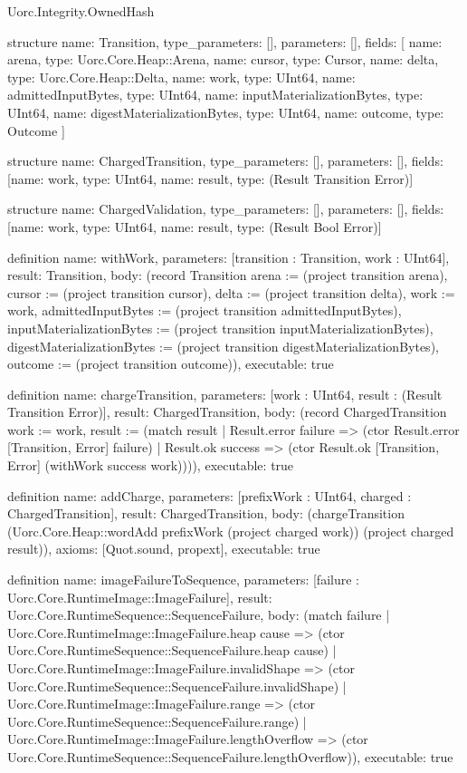 \begin{lexlean}{Uorc.Integrity.OwnedHash}
\begin{semanticmodule}
structure{
  name: Transition,
  type_parameters: [],
  parameters: [],
  fields: [
    {name: arena, type: Uorc.Core.Heap::Arena},
    {name: cursor, type: Cursor},
    {name: delta, type: Uorc.Core.Heap::Delta},
    {name: work, type: UInt64},
    {name: admittedInputBytes, type: UInt64},
    {name: inputMaterializationBytes, type: UInt64},
    {name: digestMaterializationBytes, type: UInt64},
    {name: outcome, type: Outcome}
  ]
}

structure{
  name: ChargedTransition,
  type_parameters: [],
  parameters: [],
  fields: [{name: work, type: UInt64}, {name: result, type: (Result Transition Error)}]
}

structure{
  name: ChargedValidation,
  type_parameters: [],
  parameters: [],
  fields: [{name: work, type: UInt64}, {name: result, type: (Result Bool Error)}]
}

definition{
  name: withWork,
  parameters: [transition : Transition, work : UInt64],
  result: Transition,
  body: (record Transition {arena := (project transition arena), cursor := (project transition cursor), delta := (project transition delta), work := work, admittedInputBytes := (project transition admittedInputBytes), inputMaterializationBytes := (project transition inputMaterializationBytes), digestMaterializationBytes := (project transition digestMaterializationBytes), outcome := (project transition outcome)}),
  executable: true
}

definition{
  name: chargeTransition,
  parameters: [work : UInt64, result : (Result Transition Error)],
  result: ChargedTransition,
  body: (record ChargedTransition {work := work, result := (match result
    | Result.error failure => (ctor Result.error [Transition, Error] failure)
    | Result.ok success => (ctor Result.ok [Transition, Error] (withWork success work)))}),
  executable: true
}

definition{
  name: addCharge,
  parameters: [prefixWork : UInt64, charged : ChargedTransition],
  result: ChargedTransition,
  body: (chargeTransition (Uorc.Core.Heap::wordAdd prefixWork (project charged work)) (project charged result)),
  axioms: [Quot.sound, propext],
  executable: true
}

definition{
  name: imageFailureToSequence,
  parameters: [failure : Uorc.Core.RuntimeImage::ImageFailure],
  result: Uorc.Core.RuntimeSequence::SequenceFailure,
  body: (match failure
    | Uorc.Core.RuntimeImage::ImageFailure.heap cause => (ctor Uorc.Core.RuntimeSequence::SequenceFailure.heap cause)
    | Uorc.Core.RuntimeImage::ImageFailure.invalidShape => (ctor Uorc.Core.RuntimeSequence::SequenceFailure.invalidShape)
    | Uorc.Core.RuntimeImage::ImageFailure.range => (ctor Uorc.Core.RuntimeSequence::SequenceFailure.range)
    | Uorc.Core.RuntimeImage::ImageFailure.lengthOverflow => (ctor Uorc.Core.RuntimeSequence::SequenceFailure.lengthOverflow)),
  executable: true
}


\end{semanticmodule}
\end{lexlean}
